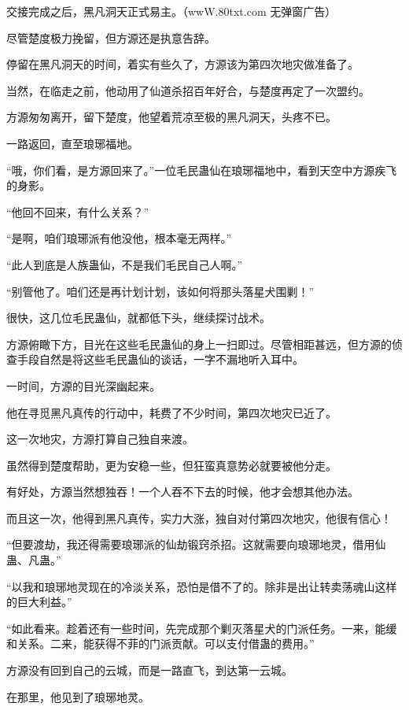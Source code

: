 
\begin{this_body}

交接完成之后，黑凡洞天正式易主。（wwW.80txt.com 无弹窗广告）

尽管楚度极力挽留，但方源还是执意告辞。

停留在黑凡洞天的时间，着实有些久了，方源该为第四次地灾做准备了。

当然，在临走之前，他动用了仙道杀招百年好合，与楚度再定了一次盟约。

方源匆匆离开，留下楚度，他望着荒凉至极的黑凡洞天，头疼不已。

一路返回，直至琅琊福地。

“哦，你们看，是方源回来了。”一位毛民蛊仙在琅琊福地中，看到天空中方源疾飞的身影。

“他回不回来，有什么关系？”

“是啊，咱们琅琊派有他没他，根本毫无两样。”

“此人到底是人族蛊仙，不是我们毛民自己人啊。”

“别管他了。咱们还是再计划计划，该如何将那头落星犬围剿！”

很快，这几位毛民蛊仙，就都低下头，继续探讨战术。

方源俯瞰下方，目光在这些毛民蛊仙的身上一扫即过。尽管相距甚远，但方源的侦查手段自然是将这些毛民蛊仙的谈话，一字不漏地听入耳中。

一时间，方源的目光深幽起来。

他在寻觅黑凡真传的行动中，耗费了不少时间，第四次地灾已近了。

这一次地灾，方源打算自己独自来渡。

虽然得到楚度帮助，更为安稳一些，但狂蛮真意势必就要被他分走。

有好处，方源当然想独吞！一个人吞不下去的时候，他才会想其他办法。

而且这一次，他得到黑凡真传，实力大涨，独自对付第四次地灾，他很有信心！

“但要渡劫，我还得需要琅琊派的仙劫锻窍杀招。这就需要向琅琊地灵，借用仙蛊、凡蛊。”

“以我和琅琊地灵现在的冷淡关系，恐怕是借不了的。除非是出让转卖荡魂山这样的巨大利益。”

“如此看来。趁着还有一些时间，先完成那个剿灭落星犬的门派任务。一来，能缓和关系。二来，能获得不菲的门派贡献。可以支付借蛊的费用。”

方源没有回到自己的云城，而是一路直飞，到达第一云城。

在那里，他见到了琅琊地灵。


\end{this_body}
